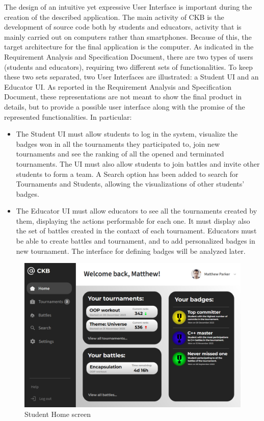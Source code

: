 
The design of an intuitive yet expressive User Interface is important during the creation of the described application. The main activity of CKB is the development of source code both by students and educators, activity that is mainly carried out on computers rather than smartphones. Because of this, the target architecture for the final application is the computer. As indicated in the Requirement Analysis and Specification Document, there are two types of users (students and educators), requiring two different sets of functionalities. To keep these two sets separated, two User Interfaces are illustrated: a Student UI and an Educator UI. As reported in the Requirement Analysis and Specification Document, these representations are not meant to show the final product in details, but to provide a possible user interface along with the promise of the represented functionalities.
In particular:
\begin{itemize}
    \item 
    The Student UI must allow students to log in the system, visualize the badges won in all the tournaments they participated to, join new tournaments and see the ranking of all the opened and terminated tournaments. The UI must also allow students to join battles and invite other students to form a team. A Search option has been added to search for Tournaments and Students, allowing the visualizations of other students' badges.
    \item
    The Educator UI must allow educators to see all the tournaments created by them, displaying the actions performable for each one. It must display also the set of battles created in the contaxt of each tournament. Educators must be able to create battles and tournament, and to add personalized badges in new tournament. The interface for defining badges will be analyzed later.
\end{itemize}

\begin{figure}[H]
    \centering
    \includegraphics[width=0.8\linewidth]{Images/UI_Student_Home.png}
    \caption{Student Home screen}
    \label{fig:enter-label}
\end{figure}

